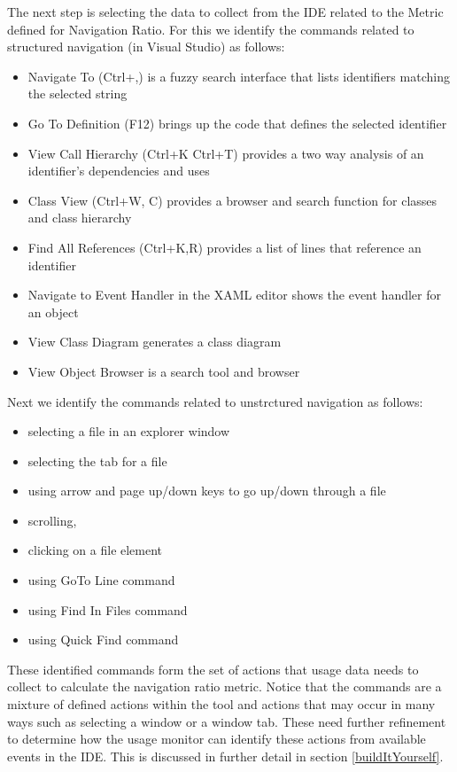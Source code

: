 The next step is selecting the data to collect from the IDE related to the Metric defined for Navigation Ratio.  For this we identify the  commands related to structured navigation (in Visual Studio) as follows:
\begin{itemize}
\item
 Navigate To (Ctrl+,) is a fuzzy search interface that lists identifiers matching the selected string
\item Go To Definition (F12) brings up the code that defines the selected identifier
\item View Call Hierarchy (Ctrl+K Ctrl+T) provides a two way analysis of an identifier's dependencies and uses
\item Class View (Ctrl+W, C) provides a browser and search function for classes and class hierarchy
\item Find All References (Ctrl+K,R) provides a list of lines that reference an identifier
\item Navigate to Event Handler in the XAML editor shows the event handler for an object
\item View Class Diagram generates a class diagram
\item View Object Browser is a search tool and browser
\end{itemize}

Next we identify the commands related to unstrctured navigation as follows:
\begin{itemize}
\item selecting a file in an explorer window
\item selecting the tab for a file
\item using arrow and page up/down keys to go up/down through a file
\item scrolling,
\item clicking on a file element
\item using GoTo Line command
\item using Find In Files command
\item using Quick Find command
\end{itemize}

These identified commands form the set of actions that usage data needs to collect to calculate the navigation ratio metric.  Notice that the commands are a mixture of defined actions within the tool and actions that may occur in many ways such as selecting a window or a window tab.  These need further refinement to determine how the usage monitor can identify these actions from available events in the IDE.  This is discussed in further detail in section \ref{buildItYourself}.

